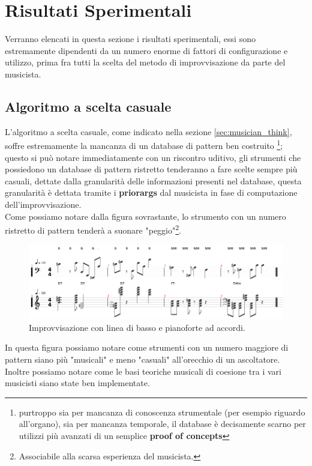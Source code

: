 \section{Risultati Sperimentali}
Verranno elencati in questa sezione i risultati sperimentali, essi
sono estremamente dipendenti da un numero enorme di fattori di configurazione
e utilizzo, prima fra tutti la scelta del metodo di improvvisazione da parte
del musicista.

\subsection{Algoritmo a scelta casuale}
L'algoritmo a scelta casuale, come indicato nella sezione \ref{sec:musician_think},
soffre estremamente la mancanza di un database di pattern ben costruito
\footnote{purtroppo sia per mancanza di conoscenza strumentale
(per esempio riguardo all'organo), sia per mancanza temporale,
il database è decisamente scarno per utilizzi più avanzati di un semplice
\textbf{proof of concepts}};
\\
questo si può notare immediatamente con un riscontro uditivo,
gli strumenti che possiedono un database di pattern ristretto tenderanno
a fare scelte sempre più casuali, dettate dalla granularità delle informazioni
presenti nel database, questa granularità è dettata tramite i \textbf{priorargs}
dal musicista in fase di computazione dell'improvvisazione.\\
Come possiamo notare dalla figura sovrastante, lo strumento con un numero ristretto
di pattern tenderà a suonare "peggio"\footnote{Associabile alla scarsa esperienza del musicista.}.
\\
\begin{figure}[H]
\centering
\caption{Improvvisazione con linea di basso e pianoforte ad accordi.}
\includegraphics[width=\textwidth]{img/bassmatch.png}
\end{figure}
In questa figura possiamo notare come strumenti con un numero maggiore di pattern siano
più "musicali" e meno "casuali" all'orecchio di un ascoltatore.\\
Inoltre possiamo notare come le basi teoriche musicali
di coesione tra i vari musicisti siano state ben implementate.

